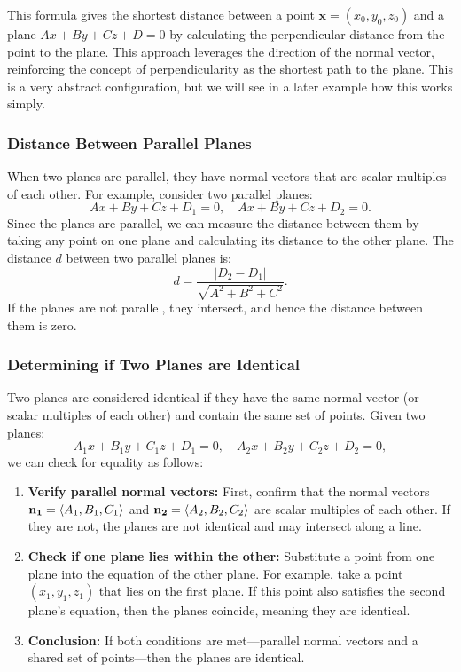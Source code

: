 \noindent This formula gives the shortest distance between a point \( \mathbf{x} = (x_0, y_0, z_0) \) and a plane \( Ax + By + Cz + D = 0 \) by calculating the perpendicular distance from the point to the plane. This approach leverages the direction of the normal vector, reinforcing the concept of perpendicularity as the shortest path to the plane. This is a very abstract configuration, but we will see in a later example how this works simply.

\subsubsection*{Distance Between Parallel Planes}

\noindent When two planes are parallel, they have normal vectors that are scalar multiples of each other. For example, consider two parallel planes:
\[
A x + B y + C z + D_1 = 0, \quad A x + B y + C z + D_2 = 0.
\]
Since the planes are parallel, we can measure the distance between them by taking any point on one plane and calculating its distance to the other plane. The distance \( d \) between two parallel planes is:
\[
d = \frac{|D_2 - D_1|}{\sqrt{A^2 + B^2 + C^2}}.
\]
\noindent If the planes are not parallel, they intersect, and hence the distance between them is zero.

\subsubsection*{Determining if Two Planes are Identical}

\noindent Two planes are considered identical if they have the same normal vector (or scalar multiples of each other) and contain the same set of points. Given two planes:
\[
A_1 x + B_1 y + C_1 z + D_1 = 0, \quad A_2 x + B_2 y + C_2 z + D_2 = 0,
\]
we can check for equality as follows:

\begin{enumerate}
    \item \textbf{Verify parallel normal vectors:} First, confirm that the normal vectors \( \vb{n_1} = \langle A_1, B_1, C_1 \rangle \) and \( \vb{n_2} = \langle A_2, B_2, C_2 \rangle \) are scalar multiples of each other. If they are not, the planes are not identical and may intersect along a line.
    
    \item \textbf{Check if one plane lies within the other:} Substitute a point from one plane into the equation of the other plane. For example, take a point \( (x_1, y_1, z_1) \) that lies on the first plane. If this point also satisfies the second plane's equation, then the planes coincide, meaning they are identical. 
    
    \item \textbf{Conclusion:} If both conditions are met—parallel normal vectors and a shared set of points—then the planes are identical.
\end{enumerate}




